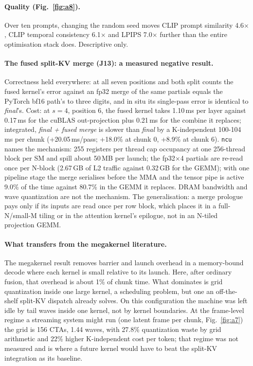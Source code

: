 \documentclass[10pt,a4paper]{article}
\begin{document}
\paragraph{Quality (Fig.~\ref{fig:a8}).} Over ten prompts, changing the random seed moves CLIP prompt similarity 4.6$\times$, CLIP temporal consistency 6.1$\times$ and LPIPS 7.0$\times$ further than the entire optimisation stack does. Descriptive only.

\paragraph{The fused split-KV merge (J13): a measured negative result.} Correctness held everywhere: at all seven positions and both split counts the fused kernel's error against an fp32 merge of the same partials equals the PyTorch bf16 path's to three digits, and in situ its single-pass error is identical to \emph{final}'s. Cost: at $s=4$, position 6, the fused kernel takes 1.10\,ms per layer against 0.17\,ms for the cuBLAS out-projection plus 0.21\,ms for the combine it replaces; integrated, \emph{final + fused merge} is slower than \emph{final} by a K-independent 100-104\,ms per chunk (+20.05\,ms/pass; +18.0\% at chunk 0, +8.9\% at chunk 6). \texttt{ncu} names the mechanism: 255 registers per thread cap occupancy at one 256-thread block per SM and spill about 50\,MB per launch; the fp32$\times$4 partials are re-read once per N-block (2.67\,GB of L2 traffic against 0.32\,GB for the GEMM); with one pipeline stage the merge serialises before the MMA and the tensor pipe is active 9.0\% of the time against 80.7\% in the GEMM it replaces. DRAM bandwidth and wave quantization are not the mechanism. The generalisation: a merge prologue pays only if its inputs are read once per row block, which places it in a full-N/small-M tiling or in the attention kernel's epilogue, not in an N-tiled projection GEMM.

\paragraph{What transfers from the megakernel literature.} The megakernel result removes barrier and launch overhead in a memory-bound decode where each kernel is small relative to its launch. Here, after ordinary fusion, that overhead is about 1\% of chunk time. What dominates is grid quantization inside one large kernel, a scheduling problem, but one an off-the-shelf split-KV dispatch already solves. On this configuration the machine was left idle by tail waves inside one kernel, not by kernel boundaries. At the frame-level regime a streaming system might run (one latent frame per chunk, Fig.~\ref{fig:a7}) the grid is 156 CTAs, 1.44 waves, with 27.8\% quantization waste by grid arithmetic and 22\% higher K-independent cost per token; that regime was not measured and is where a future kernel would have to beat the split-KV integration as its baseline.
\end{document}
